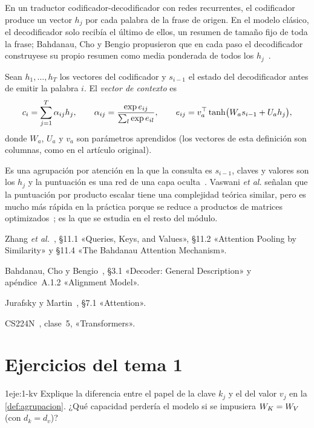 En un traductor codificador-decodificador con redes recurrentes, el codificador produce un vector $h_j$ por cada palabra de la frase de origen. En el modelo clásico, el decodificador solo recibía el último de ellos, un resumen de tamaño fijo de toda la frase; Bahdanau, Cho y Bengio propusieron que en cada paso el decodificador construyese su propio resumen como media ponderada de todos los $h_j$~\cite[§3.1]{bahdanau}.

\begin{definicion}\label{def:aditiva}
Sean $h_1,\dots,h_{T}$ los vectores del codificador y $s_{i-1}$ el estado del decodificador antes de emitir la palabra $i$. El \emph{vector de contexto} es
\[
c_i=\sum_{j=1}^{T}\alpha_{ij}h_j,\qquad \alpha_{ij}=\frac{\exp e_{ij}}{\sum_{l}\exp e_{il}},\qquad e_{ij}=v_a^{\top}\tanh\bigl(W_as_{i-1}+U_ah_j\bigr),
\]
donde $W_a$, $U_a$ y $v_a$ son parámetros aprendidos (los vectores de esta definición son columnas, como en el artículo original).
\end{definicion}

Es una agrupación por atención en la que la consulta es $s_{i-1}$, claves y valores son los $h_j$ y la puntuación es una red de una capa oculta~\cite[apéndice~A.1.2]{bahdanau}. Vaswani \emph{et al.} señalan que la puntuación por producto escalar tiene una complejidad teórica similar, pero es mucho más rápida en la práctica porque se reduce a productos de matrices optimizados~\cite[§3.2.1]{vaswani}; es la que se estudia en el resto del módulo.

\begin{lecturas}
\item Zhang \emph{et al.}~\cite{d2l}, §11.1 «Queries, Keys, and Values», §11.2 «Attention Pooling by Similarity» y §11.4 «The Bahdanau Attention Mechanism».
\item Bahdanau, Cho y Bengio~\cite{bahdanau}, §3.1 «Decoder: General Description» y apéndice~A.1.2 «Alignment Model».
\item Jurafsky y Martin~\cite{jm3}, §7.1 «Attention».
\item CS224N~\cite{cs224n}, clase~5, «Transformers».
\end{lecturas}

\section*{Ejercicios del tema 1}

\begin{ejercicio}{1}{eje:1-kv}
Explique la diferencia entre el papel de la clave $k_j$ y el del valor $v_j$ en la \cref{def:agrupacion}. ¿Qué capacidad perdería el modelo si se impusiera $W_{K}=W_{V}$ (con $d_k=d_v$)?
\end{ejercicio}

